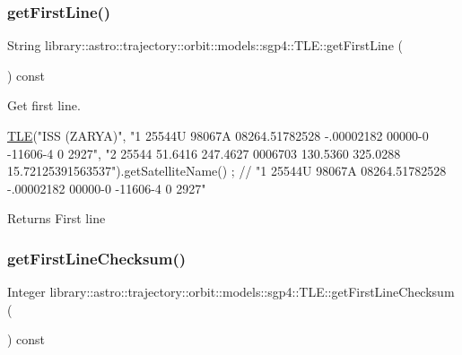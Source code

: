 \subsubsection{\texorpdfstring{get\+First\+Line()}{getFirstLine()}}
{\footnotesize\ttfamily String library\+::astro\+::trajectory\+::orbit\+::models\+::sgp4\+::\+T\+L\+E\+::get\+First\+Line (\begin{DoxyParamCaption}{ }\end{DoxyParamCaption}) const}



Get first line. 


\begin{DoxyCode}
\hyperlink{classlibrary_1_1astro_1_1trajectory_1_1orbit_1_1models_1_1sgp4_1_1_t_l_e_a4d2b43f02cef44f0c9635daf9946261c}{TLE}(\textcolor{stringliteral}{"ISS (ZARYA)"},
    \textcolor{stringliteral}{"1 25544U 98067A   08264.51782528 -.00002182  00000-0 -11606-4 0  2927"},
    \textcolor{stringliteral}{"2 25544  51.6416 247.4627 0006703 130.5360 325.0288 15.72125391563537"}).getSatelliteName() ; \textcolor{comment}{// "1
       25544U 98067A   08264.51782528 -.00002182  00000-0 -11606-4 0  2927"}
\end{DoxyCode}


\begin{DoxyReturn}{Returns}
First line 
\end{DoxyReturn}
\mbox{\label{classlibrary_1_1astro_1_1trajectory_1_1orbit_1_1models_1_1sgp4_1_1_t_l_e_a6cc7370618c797916a3de07be08c1050}} 
\subsubsection{\texorpdfstring{get\+First\+Line\+Checksum()}{getFirstLineChecksum()}}
{\footnotesize\ttfamily Integer library\+::astro\+::trajectory\+::orbit\+::models\+::sgp4\+::\+T\+L\+E\+::get\+First\+Line\+Checksum (\begin{DoxyParamCaption}{ }\end{DoxyParamCaption}) const}



